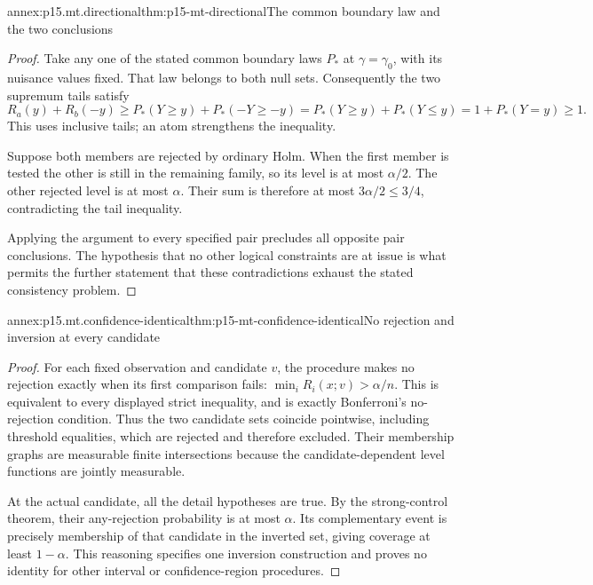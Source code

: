 \begin{annexitem}{annex:p15.mt.directional}{thm:p15-mt-directional}{The common boundary law and the two conclusions}
\begin{proof}
Take any one of the stated common boundary laws \(P_*\) at
\(\gamma=\gamma_0\), with its nuisance values fixed. That law belongs
to both null sets. Consequently the two supremum tails satisfy
\[
 R_a(y)+R_b(-y)
  \geq P_*(Y\geq y)+P_*(-Y\geq-y)
  =P_*(Y\geq y)+P_*(Y\leq y)
  =1+P_*(Y=y)\geq1.
\]
This uses inclusive tails; an atom strengthens the inequality.

Suppose both members are rejected by ordinary Holm. When the first
member is tested the other is still in the remaining family, so its
level is at most \(\alpha/2\). The other rejected level is at most
\(\alpha\). Their sum is therefore at most \(3\alpha/2\leq3/4\),
contradicting the tail inequality.

Applying the argument to every specified pair precludes all opposite
pair conclusions. The hypothesis that no other logical constraints
are at issue is what permits the further statement that these
contradictions exhaust the stated consistency problem.
\end{proof}
\end{annexitem}

\begin{annexitem}{annex:p15.mt.confidence-identical}{thm:p15-mt-confidence-identical}{No rejection and inversion at every candidate}
\begin{proof}
For each fixed observation and candidate \(v\), the procedure makes
no rejection exactly when its first comparison fails:
\(\min_iR_i(x;v)>\alpha/n\). This is equivalent to every displayed
strict inequality, and is exactly Bonferroni's no-rejection condition.
Thus the two candidate sets coincide pointwise, including threshold
equalities, which are rejected and therefore excluded.
Their membership graphs are measurable finite intersections because
the candidate-dependent level functions are jointly measurable.

At the actual candidate, all the detail hypotheses are true. By the
strong-control theorem, their any-rejection probability is at most
\(\alpha\). Its complementary event is precisely membership of that
candidate in the inverted set, giving coverage at least \(1-\alpha\).
This reasoning specifies one inversion construction and proves no
identity for other interval or confidence-region procedures.
\end{proof}
\end{annexitem}

